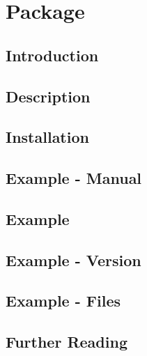 %
%
%


\chapter{Package }


\section{Introduction}



\section{Description}


\section{Installation}



\section{Example - Manual}

\section{Example}

\section{Example - Version}

\section{Example - Files}




\section{Further Reading}

\nocite{Abadi:2016}

   \printbibliography[heading=subbibliography, segment=\therefsegment]










